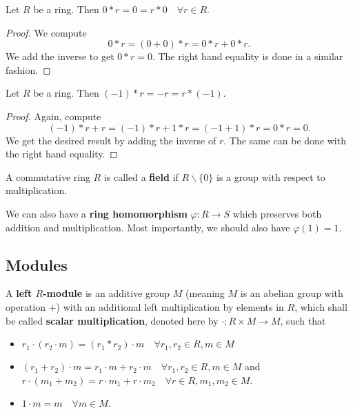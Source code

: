 \begin{prop}
Let $R$ be a ring. Then $0 * r = 0 = r * 0 \quad \forall r \in R$.
\end{prop}
\begin{proof}
We compute
\[ 0 * r = \left(0 + 0\right) * r = 0 * r + 0 * r. \]
We add the inverse to get $0 * r = 0$. The right hand equality is done
in a similar fashion.
\end{proof}

\begin{prop}
Let $R$ be a ring. Then $\left(-1\right) * r = -r = r * \left(-1\right)$.
\end{prop}
\begin{proof}
Again, compute
\[ \left(-1\right) * r + r = \left(-1\right) * r + 1 * r = \left(-1 +
1\right) * r = 0 * r = 0. \]
We get the desired result by adding the inverse of $r$. The same can be
done with the right hand equality.
\end{proof}

\begin{df}
A commutative ring $R$ is called a \textbf{field} if $R \backslash \lbrace 0
\rbrace $ is a group with respect to multiplication.
\end{df}

\begin{df}
We can also have a \textbf{ring homomorphism} $\varphi : R \rightarrow
S$ which preserves both addition and multiplication. Most importantly,
we should also have $\varphi(1) = 1$.
\end{df}

\subsection{Modules}
\begin{df}
A \textbf{left $R$-module} is an additive group $M$ (meaning $M$ is an
abelian group with operation $+$) with an additional left multiplication
by elements in $R$, which shall be called \textbf{scalar
multiplication}, denoted here by $\cdot : R \times M \rightarrow M$,
such that
\begin{itemize}
\item $r_1 \cdot \left(r_2 \cdot m\right) = \left(r_1 * r_2\right) \cdot
m \quad \forall r_1, r_2 \in R, m \in M$
\item $\left(r_1 + r_2\right) \cdot m = r_1 \cdot m + r_2 \cdot m \quad
\forall r_1, r_2 \in R, m \in M$ and $r \cdot \left(m_1 + m_2\right) = r
\cdot m_1 + r \cdot m_2 \quad \forall r \in R, m_1, m_2 \in M$.
\item $1 \cdot m = m \quad \forall m \in M$.
\end{itemize}
\end{df}


